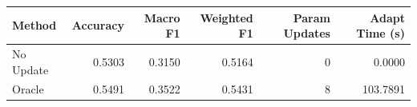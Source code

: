 \begin{tabular}{lrrrrr}
\toprule
Method & Accuracy & Macro F1 & Weighted F1 & Param Updates & Adapt Time (s) \\
\midrule
No Update & 0.5303 & 0.3150 & 0.5164 & 0 & 0.0000 \\
Oracle & 0.5491 & 0.3522 & 0.5431 & 8 & 103.7891 \\
\bottomrule
\end{tabular}
